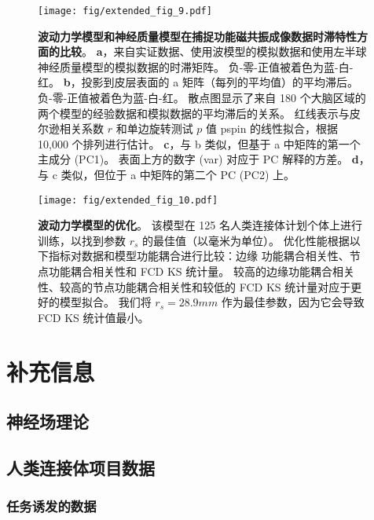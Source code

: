 \documentclass[lang=cn,a4paper,newtx]{elegantpaper}
\begin{document}
\begin{figure}[!htb] 
	\centering
	\texttt{[image: fig/extended\_fig\_9.pdf]}
	\caption{\textbf{波动力学模型和神经质量模型在捕捉功能磁共振成像数据时滞特性方面的比较}。
	\textbf{a}，来自实证数据、使用波模型的模拟数据和使用左半球神经质量模型的模拟数据的时滞矩阵。
	负-零-正值被着色为蓝-白-红。
	\textbf{b}，投影到皮层表面的 a 矩阵（每列的平均值）的平均滞后。
	负-零-正值被着色为蓝-白-红。
	散点图显示了来自 180 个大脑区域的两个模型的经验数据和模拟数据的平均滞后的关系。
	红线表示与皮尔逊相关系数 $ r $ 和单边旋转测试 $ p $ 值 pspin 的线性拟合，根据 10,000 个排列进行估计。 
	\textbf{c}，与 b 类似，但基于 a 中矩阵的第一个主成分 (PC1)。
	表面上方的数字 (var) 对应于 PC 解释的方差。
	\textbf{d}，与 c 类似，但位于 a 中矩阵的第二个 PC (PC2) 上。}
	\label{fig:extended_fig_9}
\end{figure}


\begin{figure}[!htb] 
	\centering
	\texttt{[image: fig/extended\_fig\_10.pdf]}
	\caption{\textbf{波动力学模型的优化}。
	该模型在 125 名人类连接体计划个体上进行训练，以找到参数 $ r_s $ 的最佳值（以毫米为单位）。
	优化性能根据以下指标对数据和模型功能耦合进行比较：边缘 功能耦合相关性、节点功能耦合相关性和 FCD KS 统计量。
	较高的边缘功能耦合相关性、较高的节点功能耦合相关性和较低的 FCD KS 统计量对应于更好的模型拟合。
	我们将 $ r_s = 28.9 mm $ 作为最佳参数，因为它会导致 FCD KS 统计值最小。}
	\label{fig:extended_fig_10}
\end{figure}



\section{补充信息}

\subsection{神经场理论} \label{sec:NFT}

\subsection{人类连接体项目数据} \label{sec:sup_2}

\subsubsection{任务诱发的数据} \label{sec:sup_2_1}
\end{document}
